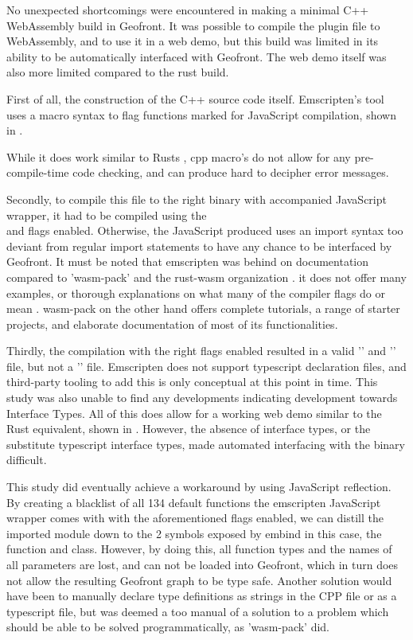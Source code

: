 No unexpected shortcomings were encountered in making a minimal C++ WebAssembly build in Geofront.
It was possible to compile the plugin file to WebAssembly, and to use it in a web demo, but this build was limited in its ability to be automatically interfaced with Geofront.
The web demo itself was also more limited compared to the rust build.

First of all, the construction of the C++ source code itself.
Emscripten's  tool uses a macro syntax to flag functions marked for JavaScript compilation, shown in . 

While it does work similar to Rusts , cpp macro's do not allow for any pre-compile-time code checking, and can produce hard to decipher error messages. 

Secondly, to compile this file to the right binary with accompanied JavaScript wrapper, it had to be compiled using the \\  and  flags enabled.
Otherwise, the JavaScript produced uses an import syntax too deviant from regular import statements to have any chance to be interfaced by Geofront. 
It must be noted that emscripten was behind on documentation compared to 'wasm-pack' and the rust-wasm organization \citep{contributors_wasm-pack_2022}. 
it does not offer many examples, or thorough explanations on what many of the compiler flags do or mean \citep{emscripten_organization_emscripten_2022}.
wasm-pack on the other hand offers complete tutorials, a range of starter projects, and elaborate documentation of most of its functionalities. 

Thirdly, the compilation with the right flags enabled resulted in a valid '' and '' file, but not a '' file.
Emscripten does not support typescript declaration files, and third-party tooling to add this is only conceptual at this point in time. 
This study was also unable to find any developments indicating development towards Interface Types.
All of this does allow for a working web demo similar to the Rust equivalent, shown in . However, the absence of interface types, or the substitute typescript interface types, made automated interfacing with the binary difficult. 

This study did eventually achieve a workaround by using JavaScript reflection.
By creating a blacklist of all 134 default functions the emscripten JavaScript wrapper comes with with the aforementioned flags enabled, we can distill the imported module down to the 2 symbols exposed by embind in this case, the  function and  class.
However, by doing this, all function types and the names of all parameters are lost, and can not be loaded into Geofront, which in turn does not allow the resulting Geofront graph to be type safe. 
Another solution would have been to manually declare type definitions as strings in the CPP file or as a typescript file, but was deemed a too manual of a solution to a problem which should be able to be solved programmatically, as 'wasm-pack' did.

